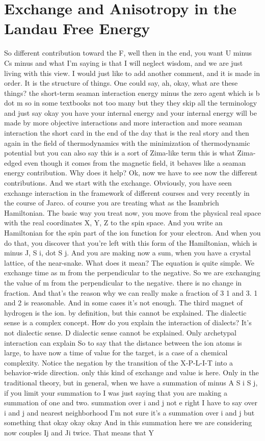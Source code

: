 \chapter{Exchange and Anisotropy in the Landau Free Energy}
So different contribution toward the F, well then in the end, you want U minus Cs minus and what I'm saying is that I will neglect wisdom, and we are just living with this view. I would just like to add another comment, and it is made in order. It is the structure of things. One could say, ah, okay, what are these things? the short-term seaman interaction energy minus the zero agent which is b dot m so in some textbooks not too many but they they skip all the terminology and just say okay you have your internal energy and your internal energy will be made by more objective interactions and more interaction and more seaman interaction the short card in the end of the day that is the real story and then again in the field of thermodynamics with the minimization of thermodynamic potential but you can also say this is a sort of Zima-like term this is what Zima-edged even though it comes from the magnetic field, it behaves like a seaman energy contribution. Why does it help? Ok, now we have to see now the different contributions. And we start with the exchange. Obviously, you have seen exchange interaction in the framework of different courses and very recently in the course of Jarco. of course you are treating what as the Isambrich Hamiltonian. The basic way you treat now, you move from the physical real space with the real coordinates X, Y, Z to the spin space. And you write an Hamiltonian for the spin part of the ion function for your electron. And when you do that, you discover that you're left with this form of the Hamiltonian, which is minus J, S i, dot S j. And you are making now a sum, when you have a crystal lattice, of the near-snake. What does it mean? The equation is quite simple. We exchange time as m from the perpendicular to the negative. So we are exchanging the value of m from the perpendicular to the negative. there is no change in fraction. And that's the reason why we can really make a fraction of 3 1 and 3. 1 and 2 is reasonable. And in some cases it's not enough. The third magnet of hydrogen is the ion. by definition, but this cannot be explained. The dialectic sense is a complex concept. How do you explain the interaction of dialects? It's not dialectic sense. D dialectic sense cannot be explained. Only archetypal interaction can explain So to say that the distance between the ion atoms is large, to have now a time of value for the target, is a case of a chemical complexity. Notice the negation by the transition of the X-P-L-I-T into a behavior-wide direction. only this kind of exchange and value is here. Only in the traditional theory, but in general, when we have a summation of minus A S i S j, if you limit your summation to I was just saying that you are making a summation of one and two. summation over i and j not e right I have to say over i and j and nearest neighborhood I'm not sure it's a summation over i and j but something that okay okay okay And in this summation here we are considering now couples Ij and Ji twice. That means that Y 
